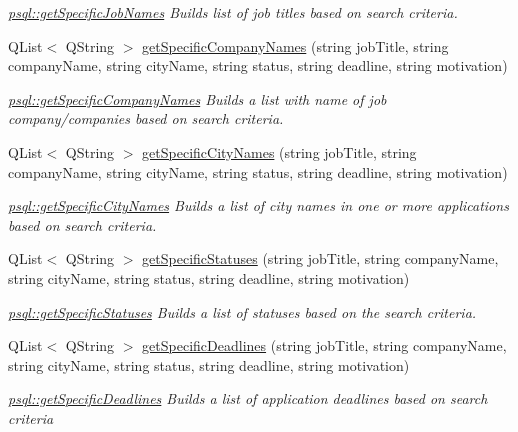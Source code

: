 \begin{DoxyCompactItemize}
\begin{DoxyCompactList}\small\item\em \hyperlink{classpsql_a029f2ef38c4156cc6c67765900c8245f}{psql\+::get\+Specific\+Job\+Names} Builds list of job titles based on search criteria. \end{DoxyCompactList}\item 
Q\+List$<$ Q\+String $>$ \hyperlink{classpsql_ac2528de5054ba99371d2d796ed32b2b1}{get\+Specific\+Company\+Names} (string job\+Title, string company\+Name, string city\+Name, string status, string deadline, string motivation)
\begin{DoxyCompactList}\small\item\em \hyperlink{classpsql_ac2528de5054ba99371d2d796ed32b2b1}{psql\+::get\+Specific\+Company\+Names} Builds a list with name of job company/companies based on search criteria. \end{DoxyCompactList}\item 
Q\+List$<$ Q\+String $>$ \hyperlink{classpsql_aace910a1e695138795d6e41765908784}{get\+Specific\+City\+Names} (string job\+Title, string company\+Name, string city\+Name, string status, string deadline, string motivation)
\begin{DoxyCompactList}\small\item\em \hyperlink{classpsql_aace910a1e695138795d6e41765908784}{psql\+::get\+Specific\+City\+Names} Builds a list of city names in one or more applications based on search criteria. \end{DoxyCompactList}\item 
Q\+List$<$ Q\+String $>$ \hyperlink{classpsql_aa04154eae71d7cdfd0fb8ab67ac032e7}{get\+Specific\+Statuses} (string job\+Title, string company\+Name, string city\+Name, string status, string deadline, string motivation)
\begin{DoxyCompactList}\small\item\em \hyperlink{classpsql_aa04154eae71d7cdfd0fb8ab67ac032e7}{psql\+::get\+Specific\+Statuses} Builds a list of statuses based on the search criteria. \end{DoxyCompactList}\item 
Q\+List$<$ Q\+String $>$ \hyperlink{classpsql_a415ebb495b96ac805880401555f72825}{get\+Specific\+Deadlines} (string job\+Title, string company\+Name, string city\+Name, string status, string deadline, string motivation)
\begin{DoxyCompactList}\small\item\em \hyperlink{classpsql_a415ebb495b96ac805880401555f72825}{psql\+::get\+Specific\+Deadlines} Builds a list of application deadlines based on search criteria \end{DoxyCompactList}\item 

\end{DoxyCompactItemize}
